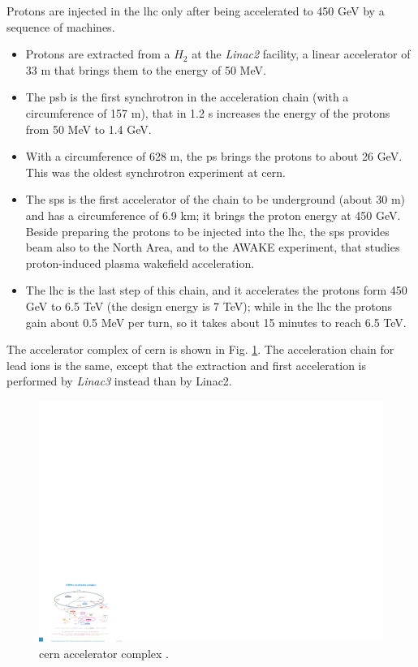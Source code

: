 Protons are injected in the \gls{lhc} only after being accelerated to 450 GeV by a sequence of machines.

\begin{itemize}
\item Protons are extracted from a $H_2$ at the \textit{Linac2} facility, a linear accelerator of 33 m that brings them to the energy of 50 MeV.
\item The \gls{psb} is the first synchrotron in the acceleration chain (with a circumference of 157 m), that in 1.2 s increases the energy of the protons from 50 MeV to 1.4 GeV.
\item With a circumference of 628 m, the \gls{ps} brings the protons to about 26 GeV. This was the oldest synchrotron experiment at \gls{cern}.
\item The \gls{sps} is the first accelerator of the chain to be underground (about 30 m) and has a circumference of 6.9 km; it brings the proton energy at 450 GeV. Beside preparing the protons to be injected into the \gls{lhc}, the \gls{sps} provides beam also to the North Area, and to the AWAKE experiment, that studies proton-induced plasma wakefield acceleration.
\item The \gls{lhc} is the last step of this chain, and it accelerates the protons form 450 GeV to 6.5 TeV (the design energy is 7 TeV); while in the \gls{lhc} the protons gain about 0.5 MeV per turn, so it takes about 15 minutes to reach 6.5 TeV.
\end{itemize}

The accelerator complex of \gls{cern} is shown in Fig. \ref{fig:lhc:acc}. The acceleration chain for lead ions is the same, except that the extraction and first acceleration is performed by \textit{Linac3} instead than by Linac2.

\begin{figure}[ht]
\centering
\includegraphics[width=1\textwidth]{figures/lhc/acc_complex.pdf}
\caption{\gls{cern} accelerator complex \cite{Christiane:1260465}.}
\label{fig:lhc:acc}
\end{figure}

